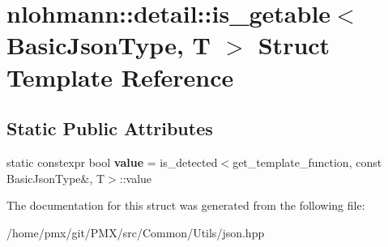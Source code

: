 \hypertarget{structnlohmann_1_1detail_1_1is__getable}{}\section{nlohmann\+:\+:detail\+:\+:is\+\_\+getable$<$ Basic\+Json\+Type, T $>$ Struct Template Reference}
\label{structnlohmann_1_1detail_1_1is__getable}
\subsection*{Static Public Attributes}
\begin{DoxyCompactItemize}
\item 
\mbox{\label{structnlohmann_1_1detail_1_1is__getable_a2150b5b5398683147928a61c99cd0070}} 
static constexpr bool {\bfseries value} = is\+\_\+detected$<$get\+\_\+template\+\_\+function, const Basic\+Json\+Type\&, T$>$\+::value
\end{DoxyCompactItemize}


The documentation for this struct was generated from the following file\+:\begin{DoxyCompactItemize}
\item 
/home/pmx/git/\+P\+M\+X/src/\+Common/\+Utils/json.\+hpp\end{DoxyCompactItemize}
